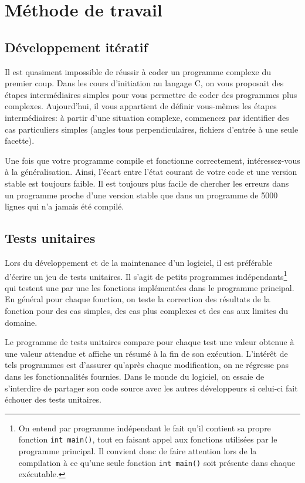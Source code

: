 \documentclass[10pt, a4paper ]{article}
\begin{document}
\section{Méthode de travail}

\subsection{Développement itératif}

Il est quasiment impossible de réussir à coder un programme complexe du premier
coup. Dans les cours d'initiation au langage C, on vous proposait des étapes
intermédiaires simples pour vous permettre de coder des programmes plus
complexes. Aujourd'hui, il vous appartient de définir vous-mêmes les étapes
intermédiaires: à partir d'une situation complexe, commencez par identifier des
cas particuliers simples (angles tous perpendiculaires, fichiers d'entrée à une
seule facette).

Une fois que votre programme compile et fonctionne correctement, intéressez-vous
à la généralisation. Ainsi, l'écart entre l'état courant de votre code et une
version stable est toujours faible.  Il est toujours plus facile de chercher les
erreurs dans un programme proche d'une version stable que dans un programme de
5000 lignes qui n'a jamais été compilé.

\subsection{Tests unitaires}

Lors du développement et de la maintenance d'un logiciel, il est préférable
d'écrire un jeu de tests unitaires. Il s'agit de petits programmes
indépendants\footnote{On entend par programme indépendant le fait qu'il contient
    sa propre fonction \texttt{int main()}, tout en faisant appel aux fonctions
    utilisées par le programme principal. Il convient donc de faire attention
    lors de la compilation à ce qu'une seule fonction \texttt{int main()} soit
présente dans chaque exécutable.} qui testent une par une les fonctions
implémentées dans le programme principal. En général pour chaque fonction, on
teste la correction des résultats de la fonction pour des cas simples, des cas
plus complexes et des cas aux limites du domaine.

Le programme de tests unitaires compare pour chaque test une valeur obtenue à
une valeur attendue et affiche un résumé à la fin de son exécution. L'intérêt de
tels programmes est d'assurer qu'après chaque modification, on ne régresse pas
dans les fonctionnalités fournies. Dans le monde du logiciel, on essaie de
s'interdire de partager son code source avec les autres développeurs si celui-ci
fait échouer des tests unitaires.
\end{document}
